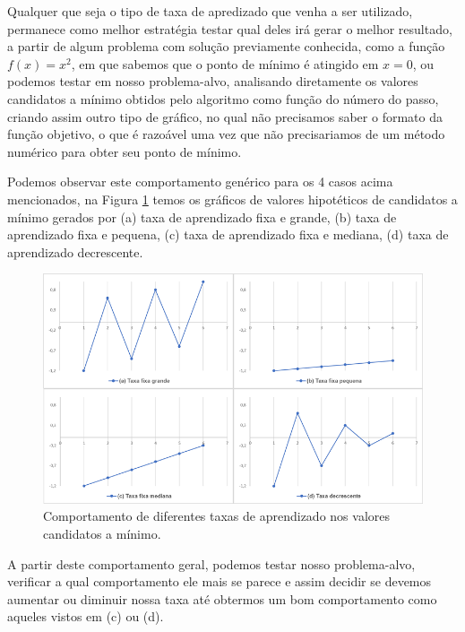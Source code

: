 Qualquer que seja o tipo de taxa de apredizado que venha a ser utilizado, permanece como melhor estratégia testar qual deles irá gerar o melhor resultado, a partir de algum problema com solução previamente conhecida, como a função $f(x) = x^2$, em que sabemos que o ponto de mínimo é atingido em $x = 0$, ou podemos testar em nosso problema-alvo, analisando diretamente os valores candidatos a mínimo obtidos pelo algoritmo como função do número do passo, criando assim outro tipo de gráfico, no qual não precisamos saber o formato da função objetivo, o que é razoável uma vez que não precisariamos de um método numérico para obter seu ponto de mínimo.

Podemos observar este comportamento genérico para os 4 casos acima mencionados, na Figura \ref{fig:grad_4} temos os gráficos de valores hipotéticos de candidatos a mínimo gerados por (a) taxa de aprendizado fixa e grande, (b) taxa de aprendizado fixa e pequena, (c) taxa de aprendizado fixa e mediana, (d) taxa de aprendizado decrescente.

\begin{figure}[htb]
\centering
\includegraphics[width=14cm]{figuras/grad_4}
\caption{Comportamento de diferentes taxas de aprendizado nos valores candidatos a mínimo.}
\label{fig:grad_4}
\end{figure}

A partir deste comportamento geral, podemos testar nosso problema-alvo, verificar a qual comportamento ele mais se parece e assim decidir se devemos aumentar ou diminuir nossa taxa até obtermos um bom comportamento como aqueles vistos em (c) ou (d).